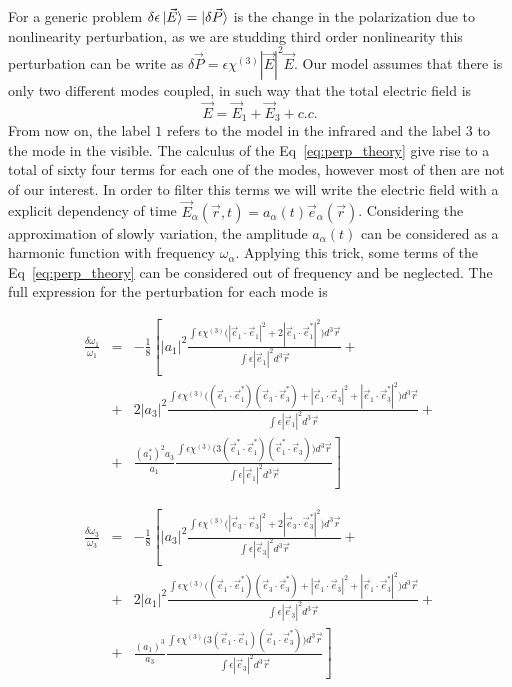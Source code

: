 For a generic problem $\delta\epsilon\ket{\vec{E}}=\ket{\delta\vec{P}}$ is the change in the polarization due to nonlinearity perturbation, as we are studding third order nonlinearity this perturbation can be write as $\delta\vec{P} = \epsilon\chi^{(3)}|\vec{E}|^2\vec{E}$. Our model assumes that there is only two different modes coupled, in such way that the total electric field is
\begin{equation}
    \vec{E} = \vec{E}_1+\vec{E}_3+c.c.
\end{equation}
From now on, the label $1$ refers to the model in the infrared and the label $3$ to the mode in the visible. 
The calculus of the Eq~\ref{eq:perp_theory} give rise to a total of sixty four terms for each one of the modes, however most of then are not of our interest. In order to filter this terms we will write the electric field with a explicit dependency of time $\vec{E}_\alpha(\vec{r},t) = a_\alpha(t) \vec{e}_\alpha(\vec{r})$. Considering the approximation of slowly variation, the amplitude $a_\alpha(t)$ can be considered as a harmonic function with frequency $\omega_\alpha$. Applying this trick, some terms of the Eq~\ref{eq:perp_theory} can be considered out of frequency and be neglected. The full expression for the perturbation for each mode is

\begin{eqnarray}
\frac{\delta\omega_1}{\omega_1} &=& -\frac{1}{8}\left[|a_1|^2\frac{\int\epsilon\chi^{(3)}
\Big(|\vec{e}_1\cdot\vec{e}_1|^2 + 2|\vec{e}_1\cdot\vec{e}_1^*|^2
\Big)d^3\vec{r}}
{\int \epsilon|\vec{e}_1|^2 d^3\vec{r}}\right. +\nonumber\\
&+&2|a_3|^2\frac{\int\epsilon\chi^{(3)}
\Big((\vec{e}_1\cdot\vec{e}_1^*)(\vec{e}_3\cdot\vec{e}_3^*)+|\vec{e}_1\cdot\vec{e}_3|^2+|\vec{e}_1\cdot\vec{e}^*_3|^2
\Big)d^3\vec{r}}
{\int \epsilon|\vec{e}_1|^2 d^3\vec{r}}+\nonumber\\
&+&\left.\frac{(a^*_1)^2a_3}{a_1}\frac{\int\epsilon\chi^{(3)}
\Big(3(\vec{e}^*_1\cdot\vec{e}_1^*)(\vec{e}^*_1\cdot\vec{e}_3)
\Big)d^3\vec{r}}
{\int \epsilon|\vec{e}_1|^2 d^3\vec{r}}\right]
\end{eqnarray}

\begin{eqnarray}
\frac{\delta\omega_3}{\omega_3} &=& -\frac{1}{8}\left[|a_3|^2\frac{\int\epsilon\chi^{(3)}
\Big(|\vec{e}_3\cdot\vec{e}_3|^2 + 2|\vec{e}_3\cdot\vec{e}_3^*|^2
\Big)d^3\vec{r}}
{\int \epsilon|\vec{e}_3|^2 d^3\vec{r}}\right. +\nonumber\\
&+&2|a_1|^2\frac{\int\epsilon\chi^{(3)}
\Big((\vec{e}_1\cdot\vec{e}_1^*)(\vec{e}_3\cdot\vec{e}_3^*)+|\vec{e}_1\cdot\vec{e}_3|^2+|\vec{e}_1\cdot\vec{e}^*_3|^2
\Big)d^3\vec{r}}
{\int \epsilon|\vec{e}_3|^2 d^3\vec{r}}+\nonumber\\
&+&\left.\frac{(a_1)^3}{a_3}\frac{\int\epsilon\chi^{(3)}
\Big(3(\vec{e}_1\cdot\vec{e}_1)(\vec{e}_1\cdot\vec{e}^*_3)
\Big)d^3\vec{r}}
{\int \epsilon|\vec{e}_3|^2 d^3\vec{r}}\right]
\end{eqnarray}

